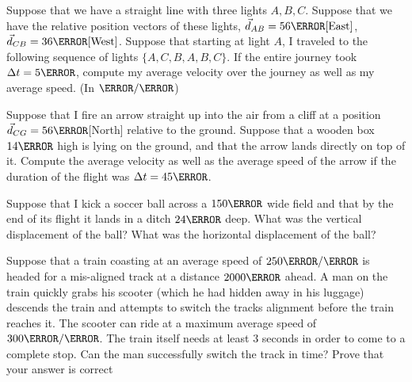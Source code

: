 \documentclass[12pt]{article} %
\newcommand{\tx}[1]{\text{#1}}
\begin{document}
\begin{qstn}[9]
Suppose that we have a straight line with three lights $A,B,C$. Suppose that we have the relative position vectors of these lights, $\vec d_{AB} = 56\m\tx{[East]}$, $\vec d_{CB} = 36\m\tx{[West]}$. Suppose that starting at light $A$, I traveled to the following sequence of lights $\{A,C,B,A,B,C\}$. If the entire journey took $\Delta t = 5\m$, compute my average velocity over the journey as well as my average speed. (In $\m / \s$) 

\end{qstn}


\begin{qstn}[10]
Suppose that I fire an arrow straight up into the air from a cliff at a position $\vec d_{CG} = 56\m$[North] relative to the ground. Suppose that a wooden box $14\m$ high is lying on the ground, and that the arrow lands directly on top of it. Compute the average velocity as well as the average speed of the arrow if the duration of the flight was $\Delta t = 45\s$. 
\end{qstn}

\begin{qstn}[11]
Suppose that I kick a soccer ball across a $150\m$ wide field and that by the end of its flight it lands in a ditch $24\m$ deep. What was the vertical displacement of the ball? What was the horizontal displacement of the ball? 

\end{qstn}

\begin{qstn}[12]
Suppose that a train coasting at an average speed of $250 \m / \s$ is headed for a mis-aligned track at a distance $2000\m$ ahead. A man on the train quickly grabs his scooter (which he had hidden away in his luggage) descends the train and attempts to switch the tracks alignment before the train reaches it. The scooter can ride at a maximum average speed of $300 \m / \s$. The train itself needs at least $3$ seconds in order to come to a complete stop. Can the man successfully switch the track in time? Prove that your answer is correct
\end{qstn}
\end{document}
